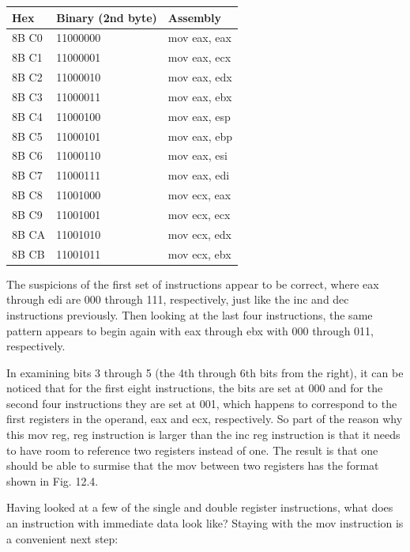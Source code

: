 \documentclass[10pt]{book}
\begin{document}
\begin{center}
\begin{center}
\begin{center}
\begin{center}
\begin{center}
\begin{center}
\begin{tabular}{|l|l|l|}
\hline
Hex & Binary (2nd byte) & Assembly \\
\hline
8B C0 & 11000000 & mov eax, eax \\
\hline
8B C1 & 11000001 & mov eax, ecx \\
\hline
8B C2 & 11000010 & mov eax, edx \\
\hline
8B C3 & 11000011 & mov eax, ebx \\
\hline
8B C4 & 11000100 & mov eax, esp \\
\hline
8B C5 & 11000101 & mov eax, ebp \\
\hline
8B C6 & 11000110 & mov eax, esi \\
\hline
8B C7 & 11000111 & mov eax, edi \\
\hline
8B C8 & 11001000 & mov ecx, eax \\
\hline
8B C9 & 11001001 & mov ecx, ecx \\
\hline
8B CA & 11001010 & mov ecx, edx \\
\hline
8B CB & 11001011 & mov ecx, ebx \\
\hline
\end{tabular}
\end{center}

The suspicions of the first set of instructions appear to be correct, where eax through edi are 000 through 111, respectively, just like the inc and dec instructions previously. Then looking at the last four instructions, the same pattern appears to begin again with eax through ebx with 000 through 011, respectively.

In examining bits 3 through 5 (the 4th through 6th bits from the right), it can be noticed that for the first eight instructions, the bits are set at 000 and for the second four instructions they are set at 001, which happens to correspond to the first registers in the operand, eax and ecx, respectively. So part of the reason why this mov reg, reg instruction is larger than the inc reg instruction is that it needs to have room to reference two registers instead of one. The result is that one should be able to surmise that the mov between two registers has the format shown in Fig. 12.4.

Having looked at a few of the single and double register instructions, what does an instruction with immediate data look like? Staying with the mov instruction is a convenient next step:


\end{center}
\end{center}
\end{center}
\end{center}
\end{center}
\end{document}

